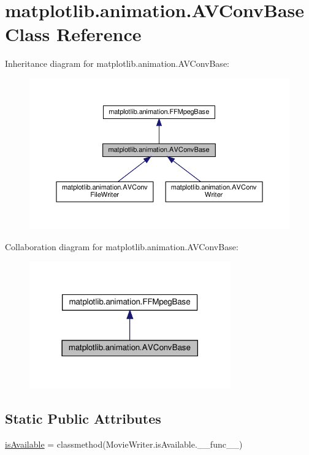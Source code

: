\hypertarget{classmatplotlib_1_1animation_1_1AVConvBase}{}\section{matplotlib.\+animation.\+A\+V\+Conv\+Base Class Reference}
\label{classmatplotlib_1_1animation_1_1AVConvBase}


Inheritance diagram for matplotlib.\+animation.\+A\+V\+Conv\+Base\+:
\nopagebreak
\begin{figure}[H]
\begin{center}
\leavevmode
\includegraphics[width=350pt]{classmatplotlib_1_1animation_1_1AVConvBase__inherit__graph}
\end{center}
\end{figure}


Collaboration diagram for matplotlib.\+animation.\+A\+V\+Conv\+Base\+:
\nopagebreak
\begin{figure}[H]
\begin{center}
\leavevmode
\includegraphics[width=246pt]{classmatplotlib_1_1animation_1_1AVConvBase__coll__graph}
\end{center}
\end{figure}
\subsection*{Static Public Attributes}
\begin{DoxyCompactItemize}
\item 
\hyperlink{classmatplotlib_1_1animation_1_1AVConvBase_aeaa6b80f14797d64dd3c55f883e99db9}{is\+Available} = classmethod(Movie\+Writer.\+is\+Available.\+\_\+\+\_\+func\+\_\+\+\_\+)
\end{DoxyCompactItemize}
